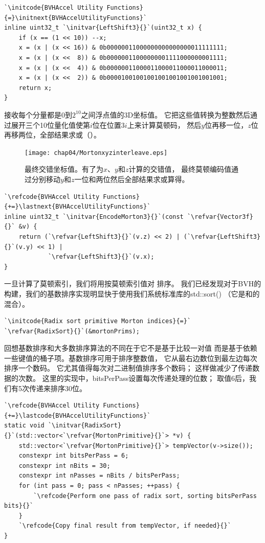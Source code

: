 \begin{lstlisting}
`\initcode{BVHAccel Utility Functions}{=}\initnext{BVHAccelUtilityFunctions}`
inline uint32_t `\initvar{LeftShift3}{}`(uint32_t x) {
    if (x == (1 << 10)) --x;
    x = (x | (x << 16)) & 0b00000011000000000000000011111111;
    x = (x | (x <<  8)) & 0b00000011000000001111000000001111;
    x = (x | (x <<  4)) & 0b00000011000011000011000011000011;
    x = (x | (x <<  2)) & 0b00001001001001001001001001001001;
    return x;
}
\end{lstlisting}

接收每个分量都是$0$到$2^{10}$之间浮点值的3D坐标值。
它把这些值转换为整数然后通过展开三个10位量化值使第$i$位在位置$3i$上来计算莫顿码，
然后$y$位再移一位，$z$位再移两位，全部结果求或（）。
\begin{figure}[htbp]
    \centering\texttt{[image: chap04/Mortonxyzinterleave.eps]}
    \caption{最终交错坐标值。有了为$x$、$y$和$z$计算的交错值，
        最终莫顿编码值通过分别移动$y$和$z$一位和两位然后全部结果求或算得。}
    \label{fig:4.11}
\end{figure}

\begin{lstlisting}
`\refcode{BVHAccel Utility Functions}{+=}\lastnext{BVHAccelUtilityFunctions}`
inline uint32_t `\initvar{EncodeMorton3}{}`(const `\refvar{Vector3f}{}` &v) {
    return (`\refvar{LeftShift3}{}`(v.z) << 2) | (`\refvar{LeftShift3}{}`(v.y) << 1) |
            `\refvar{LeftShift3}{}`(v.x);
}
\end{lstlisting}

一旦计算了莫顿索引，我们将用按莫顿索引值对
排序。
我们已经发现对于BVH的构建，我们的基数排序实现明显快于使用我们系统标准库的{\ttfamily std::sort()}
（它是和的混合）。
\begin{lstlisting}
`\initcode{Radix sort primitive Morton indices}{=}`
`\refvar{RadixSort}{}`(&mortonPrims);
\end{lstlisting}

回想基数排序和大多数排序算法的不同在于它不是基于比较一对值
而是基于依赖一些键值的桶子项。基数排序可用于排序整数值，
它从最右边数位到最左边每次排序一个数码。
它尤其值得每次对二进制值排序多个数码；
这样做减少了传递数据的次数。
这里的实现中，{\ttfamily bitsPerPass}设置每次传递处理的位数；
取值6后，我们有5次传递来排序30位。
\begin{lstlisting}
`\refcode{BVHAccel Utility Functions}{+=}\lastcode{BVHAccelUtilityFunctions}`
static void `\initvar{RadixSort}{}`(std::vector<`\refvar{MortonPrimitive}{}`> *v) {
    std::vector<`\refvar{MortonPrimitive}{}`> tempVector(v->size());
    constexpr int bitsPerPass = 6;
    constexpr int nBits = 30;
    constexpr int nPasses = nBits / bitsPerPass;
    for (int pass = 0; pass < nPasses; ++pass) {
        `\refcode{Perform one pass of radix sort, sorting bitsPerPass bits}{}`
    }
    `\refcode{Copy final result from tempVector, if needed}{}`
}
\end{lstlisting}

